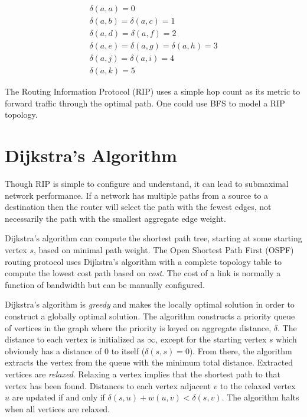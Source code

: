 \documentclass{book}
\begin{document}
\begin{align*}
\delta(a,a) = 0 \\
\delta(a,b) = \delta(a,c) = 1 \\
\delta(a,d) = \delta(a,f) = 2 \\
\delta(a,e) = \delta(a,g) = \delta(a,h) = 3 \\
\delta(a,j) = \delta(a,i) = 4 \\
\delta(a,k) = 5
\end{align*}

The Routing Information Protocol (RIP) uses a simple hop count as its metric to forward traffic through the optimal path. One could use BFS to model a RIP topology.

\section{Dijkstra's Algorithm}

Though RIP is simple to configure and understand, it can lead to submaximal network performance. If a network has multiple paths from a source to a destination then the router will select the path with the fewest edges, not necessarily the path with the smallest aggregate edge weight.

Dijkstra's algorithm can compute the shortest path tree, starting at some starting vertex $s$, based on minimal path weight. The Open Shortest Path First (OSPF) routing protocol uses Dijkstra's algorithm with a complete topology table to compute the lowest cost path based on \textit{cost}. The cost of a link is normally a function of bandwidth but can be manually configured.

Dijkstra's algorithm is \textit{greedy} and makes the locally optimal solution in order to construct a globally optimal solution. The algorithm constructs a priority queue of vertices in the graph where the priority is keyed on aggregate distance, $\delta$. The distance to each vertex is initialized as $\infty$, except for the starting vertex $s$ which obviously has a distance of 0 to itself ($\delta(s,s)=0$). From there, the algorithm extracts the vertex from the queue with the minimum total distance. Extracted vertices are \textit{relaxed}. Relaxing a vertex implies that the shortest path to that vertex has been found. Distances to each vertex adjacent $v$ to the relaxed vertex $u$ are updated if and only if $\delta(s,u)+w(u,v)<\delta(s,v)$. The algorithm halts when all vertices are relaxed.
\end{document}
